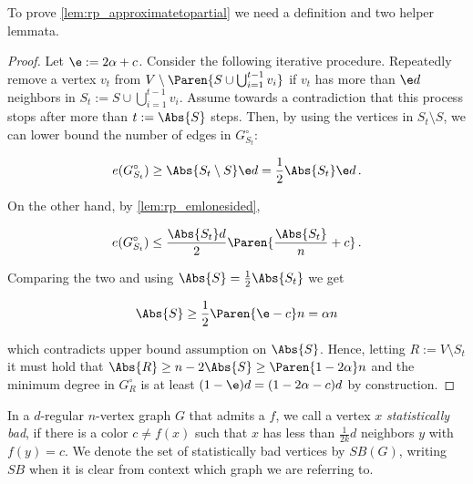 To prove \cref{lem:rp_approximatetopartial} we need a definition and two helper lemmata.


\begin{proof}
    Let $\e:=2\alpha + c$. Consider the following iterative procedure. Repeatedly remove a vertex $v_t$ from $V\setminus \Paren{S \cup \bigcup_{i=1}^{t-1} v_i}$ if $v_t$ has more than $\e d$ neighbors in $S_t := S \cup \bigcup_{i=1}^{t-1} v_i$. Assume towards a contradiction that this process stops after more than $t:=\Abs{S}$ steps. Then, by using the vertices in $S_t\setminus S$, we can lower bound the number of edges in $G_{S_t}^{\circ}$:

    $$e(G_{S_t}^{\circ})\geq \Abs{S_t\setminus S} \e d= \frac{1}{2}\Abs{S_t}\e d\,.$$

    On the other hand, by \cref{lem:rp_emlonesided},

    $$e(G_{S_t}^{\circ})\leq \frac{\Abs{S_t}d}{2}\Paren{\frac{\Abs{S_t}}{n} + c}\,.$$

    Comparing the two and using $\Abs{S}=\frac{1}{2}\Abs{S_t}$ we get

    $$\Abs{S}\geq\frac{1}{2}\Paren{\e-c}n=\alpha n$$

    which contradicts upper bound assumption on $\Abs{S}$. Hence, letting $R:=V\setminus S_t$ it must hold that $\Abs{R}\geq n-2\Abs{S}\geq \Paren{1-2\alpha}n$ and the minimum degree in $G_R^{\circ}$ is at least $(1-\e)d=(1-2\alpha-c)d$ by construction.
\end{proof}

\begin{definition}\label{def:rp_statisticallybad}
    In a $d$-regular $n$-vertex graph $G$ that admits a \kcl $f$, we call a vertex $x$ \textit{statistically bad}, if there is a color $c\neq f(x)$ such that $x$ has less than $\frac{1}{2k}d$ neighbors $y$ with $f(y)=c$. We denote the set of statistically bad vertices by $SB(G)$, writing $SB$ when it is clear from context which graph we are referring to.
\end{definition}


